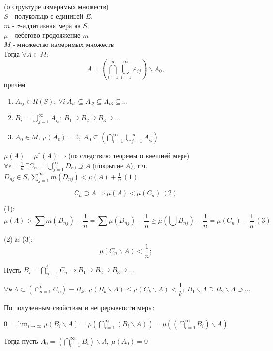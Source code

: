 
\Th (о структуре измеримых множеств)\\
$S$ - полукольцо с единицей $E$.\\
$m$ - $\sigma$-аддитивная мера на $S$.\\
$\mu$ - лебегово продолжение $m$\\
$M$ - множество измеримых множеств\\
Тогда $\forall A \in M$:
$$A = (\bigcap_{i=1}^{\infty} \bigcup_{j=1}^{\infty} A_{ij}) \backslash A_0,$$ причём 
\begin{enumerate}
    \item $A_{ij} \in R(S); \ \forall i \ A_{i1} \subseteq A_{i2} \subseteq A_{i3} \subseteq \dots $
    \item $B_i = \bigcup_{j=1}^{\infty} A_{ij}; \ B_1 \supseteq B_2 \supseteq B_3 \supseteq \dots$
    \item $A_0 \in M; \ \mu(A_0) = 0; \ A_0 \subseteq (\bigcap_{i=1}^{\infty} \bigcup_{j=1}^{\infty} A_{ij})$
\end{enumerate}

\Proof

$\mu(A) = \mu^*(A) \Rightarrow$(по следствию теоремы о внешней мере)\\ 
$\forall \epsilon = \frac{1}{n} \ \exists C_n = \bigcup_{j=1}^{\infty} D_{nj} \supseteq A$ (покрытие $A$), т.ч. $D_{nj} \in S, \sum_{j=1}^{\infty} m(D_{nj}) < \mu(A) + \frac{1}{n} \ (1)$

$$C_n \supset A \Rightarrow \mu(A) < \mu(C_n) \ (2)$$

(1): $$\mu(A) > \sum m(D_{nj}) - \frac{1}{n} = \sum \mu(D_{nj}) - \frac{1}{n} \geq \mu(\bigcup D_{nj}) - \frac{1}{n} = \mu(C_n) - \frac{1}{n} \ (3)$$

(2) \& (3): $$\mu(C_n \backslash A) < \frac{1}{n};$$

Пусть $B_i = \bigcap^i_{n=1} C_n \Rightarrow B_1 \supseteq B_2 \supseteq B_3 \supseteq \dots$

$$\forall k \ A \subset (\cap^k_{n=1} C_n) = B_k;\ \mu(B_k \backslash A) \leq \mu(C_k \backslash A) < \frac{1}{k}; \ B_1 \backslash A \supseteq B_2 \backslash A \supset \dots$$

По полученным свойствам и непрерывности меры:

$0 = \lim_{i \rightarrow \infty} \mu(B_i \backslash A) = \mu(\bigcap^{\infty}_{i=1} (B_i \backslash A)) = \mu((\bigcap^{\infty}_{i=1} B_i) \backslash A)$

Тогда пусть $A_0 = (\bigcap^{\infty}_{i=1} B_i) \backslash A, \ \mu(A_0) = 0$

